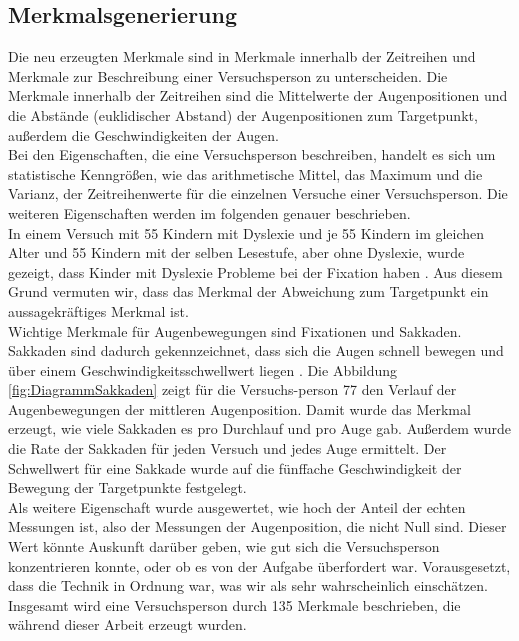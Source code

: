 \documentclass[12pt]{article}
\begin{document}
\subsection*{Merkmalsgenerierung}
Die neu erzeugten Merkmale sind in Merkmale innerhalb der Zeitreihen und Merkmale zur Beschreibung einer Versuchsperson zu unterscheiden. Die Merkmale innerhalb der Zeitreihen sind die Mittelwerte der Augenpositionen und die Abst\"ande (euklidischer Abstand) der Augenpositionen zum Targetpunkt, au\ss{}erdem die Geschwindigkeiten der Augen.\\
Bei den Eigenschaften, die eine Versuchsperson beschreiben, handelt es sich um statistische Kenngr\"o\ss{}en, wie das arithmetische Mittel, das Maximum und die Varianz, der Zeitreihenwerte f\"ur die einzelnen Versuche einer Versuchsperson. Die weiteren Eigenschaften werden im folgenden genauer beschrieben.\\
In einem Versuch mit 55 Kindern mit Dyslexie und je 55 Kindern im gleichen Alter und 55 Kindern mit der selben Lesestufe, aber ohne Dyslexie, wurde gezeigt, dass Kinder mit Dyslexie Probleme bei der Fixation haben \cite{Tiadi2016}. Aus diesem Grund vermuten wir, dass das Merkmal der Abweichung zum Targetpunkt ein aussagekr\"aftiges Merkmal ist.\\
Wichtige Merkmale f\"ur Augenbewegungen sind Fixationen und Sakkaden. Sakkaden sind dadurch gekennzeichnet, dass sich die Augen schnell bewegen und \"uber einem Geschwindigkeits\-schwellwert liegen \cite[p.~152]{EyeTracking}. Die Abbildung \ref{fig:DiagrammSakkaden} zeigt f\"ur die Versuchs-person 77 den Verlauf der Augenbewegungen der mittleren Augenposition. Damit wurde das Merkmal erzeugt, wie viele Sakkaden es pro Durchlauf und pro Auge gab. Au\ss{}erdem wurde die Rate der Sakkaden f\"ur jeden Versuch und jedes Auge ermittelt. Der Schwellwert f\"ur eine Sakkade wurde auf die f\"unffache Geschwindigkeit der Bewegung der Targetpunkte festgelegt.\\
Als weitere Eigenschaft wurde ausgewertet, wie hoch der Anteil der echten Messungen ist, also der Messungen der Augenposition, die nicht Null sind. Dieser Wert k\"onnte Auskunft dar\"uber geben, wie gut sich die Versuchsperson konzentrieren konnte, oder ob es von der Aufgabe \"uberfordert war. Vorausgesetzt, dass die Technik in Ordnung war, was wir als sehr wahrscheinlich einsch\"atzen.\\
Insgesamt wird eine Versuchsperson durch 135 Merkmale beschrieben, die w\"ahrend dieser Arbeit erzeugt wurden.
\end{document}
